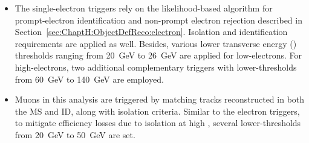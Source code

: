 \begin{comment}
	\item In the years 2016--2018, the electron triggers required electrons to satisfy a \texttt{tight} identification at the HLT, 
	along with an isolation criterion, and have an $\ET > 26\,$GeV.
	
	\item Two complementary triggers were employed throughout Run$\,$2 to mitigate efficiency losses at high \pT, 
	in addition to the previous triggers. These triggers either selected \texttt{medium} electrons with $\ET > 60\,$GeV 
	at the HLT or selected \texttt{loose} electrons with $\ET > 120\,$GeV in 2015 and 
	$\ET > 140\,$GeV in 2016--2018. 
\end{itemize}

Muons in this analysis are triggered by matching tracks reconstructed in both the MS and ID.
In \datafirstyear, the muon triggers required muons to satisfy a \texttt{loose}-isolation requirement and
have a \pT greater than $20\,$GeV. In the years 2016--2018, the isolation criterion was tightened, 
and the threshold was increased to $\pT > 26\,$GeV. The isolation criteria uses 
Similar to the electron triggers, to mitigate efficiency losses due to isolation at high \pT, an additional 
muon trigger without any isolation requirement was available throughout all these years. 
This trigger selected \texttt{loose}-isolated muons with $\pT > 50\,$GeV. 
\end{comment}

\begin{itemize}
	\item The single-electron triggers rely on the likelihood-based algorithm for prompt-electron 
	identification and non-prompt electron rejection described in Section~\ref{sec:ChaptH:ObjectDefReco:electron}.
	Isolation and identification requirements are applied as well.  
	Besides, various lower transverse energy (\ET) thresholds ranging from 20~GeV to 26~GeV 
	are applied for low-\pT electrons. 
	For high-\pT electrons, two additional complementary triggers with lower-\ET thresholds 
	from 60~GeV to 140~GeV are employed. 
	
	\item Muons in this analysis are triggered by matching tracks reconstructed in both the MS and ID,
	along with isolation criteria. Similar to the electron triggers, to mitigate efficiency losses due to 
	isolation at high \pT, several lower-\pT thresholds from 20~GeV to 50~GeV are set.
\end{itemize}




